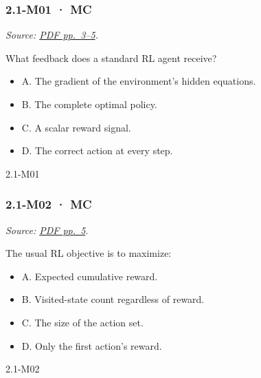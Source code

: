 \noindent\begin{minipage}{\linewidth}

\subsubsection{2.1-M01 · MC}\label{m01-mc-3}

\emph{Source:
\href{../Lecture\%20Slides/2.1.\%20Introduction\%20to\%20Reinforcement\%20Learning.pdf\#page=3}{PDF
pp.~3--5}.}

What feedback does a standard RL agent receive?

\begin{itemize}
\tightlist
\item
  A. The gradient of the environment's hidden equations.
\item
  B. The complete optimal policy.
\item
  C. A scalar reward signal.
\item
  D. The correct action at every step.
\end{itemize}

\begin{solution}[8mm]{2.1-M01}

\end{solution}
\end{minipage}\par\medskip

\noindent\begin{minipage}{\linewidth}

\subsubsection{2.1-M02 · MC}\label{m02-mc-3}

\emph{Source:
\href{../Lecture\%20Slides/2.1.\%20Introduction\%20to\%20Reinforcement\%20Learning.pdf\#page=5}{PDF
pp.~5}.}

The usual RL objective is to maximize:

\begin{itemize}
\tightlist
\item
  A. Expected cumulative reward.
\item
  B. Visited-state count regardless of reward.
\item
  C. The size of the action set.
\item
  D. Only the first action's reward.
\end{itemize}

\begin{solution}[8mm]{2.1-M02}

\end{solution}
\end{minipage}\par\medskip

